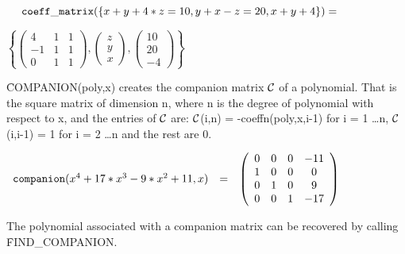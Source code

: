 \begin{math}
\hspace*{0.175in}
{\tt coeff\_matrix}(\{x+y+4*z=10,y+x-z=20,x+y+4\}) =  
\end{math}

\vspace*{0.1in}

\begin{flushleft}
\hspace*{0.175in}
\begin{math}  
\left\{ \left( \begin{array}{ccc} 4 & 1 & 1 \\ -1 & 1 & 1 \\ 0 & 1 & 1 
\end{array} \right), \left( \begin{array}{c} z \\ y \\ x \end{array} 
\right), \left( \begin{array}{c} 10 \\ 20 \\ -4 
\end{array} \right) \right\} 
\end{math}  
\end{flushleft}

\f{COMPANION}(poly,x)  creates the companion matrix ${\cal C}$ of a
polynomial.  That is the square matrix of dimension n, where n is the
degree of polynomial with respect to x, and the entries of ${\cal C}$ are: 
${\cal C}$(i,n) = -coeffn(poly,x,i-1) for i = 1 \ldots n, ${\cal
C}$(i,i-1) = 1 for i = 2 \ldots n and the rest are 0.

\begin{flushleft}  
\hspace*{0.1in}
\begin{math}  
\begin{array}{ccc}
{\tt companion}(x^4+17*x^3-9*x^2+11,x) & = & 
\left( \begin{array}{cccc} 0 & 0 & 0 & -11 \\ 1 & 0 & 0 & 0 \\ 
0 & 1 & 0 & 9 \\ 0 & 0 & 1 & -17 
\end{array} \right)
\end{array}
\end{math}  
\end{flushleft}

The polynomial associated with a companion matrix can be recovered by
calling \f{FIND\_COMPANION}.

